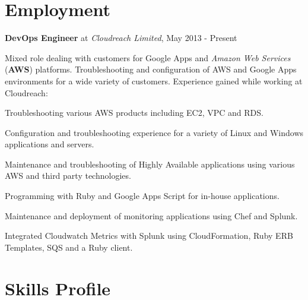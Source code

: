 \documentclass[11pt,a4paper]{article}
\renewenvironment{itemize}{
  \begin{list}{}{
    \setlength{\leftmargin}{1em}
    \setlength{\itemsep}{0.25em}
    \setlength{\parskip}{0pt}
    \setlength{\parsep}{0.25em}
    \renewcommand{\labelitemi}{$\bullet$}
  }
}{
  \end{list}
}
\begin{document}
\section*{Employment}

\begin{itemize}
    \item \textbf{DevOps Engineer} at \emph{Cloudreach Limited}, May 2013 - Present

    Mixed role dealing with customers for Google Apps and \emph{Amazon Web Services} (\textbf{AWS}) platforms. Troubleshooting and configuration of AWS and Google Apps environments for a wide variety of customers.
    Experience gained while working at Cloudreach:
    \begin{itemize}
      \item Troubleshooting various AWS products including EC2, VPC and RDS.
      \item Configuration and troubleshooting experience for a variety of Linux and Windows
        applications and servers.
      \item Maintenance and troubleshooting of Highly Available applications using various AWS and third party technologies.
      \item Programming with Ruby and Google Apps Script for in-house applications.
      \item Maintenance and deployment of monitoring applications using Chef and Splunk.
      \item Integrated Cloudwatch Metrics with Splunk using CloudFormation, Ruby ERB Templates, SQS and a Ruby client.
    \end{itemize}
\end{itemize}

\section*{Skills Profile}
\end{document}
